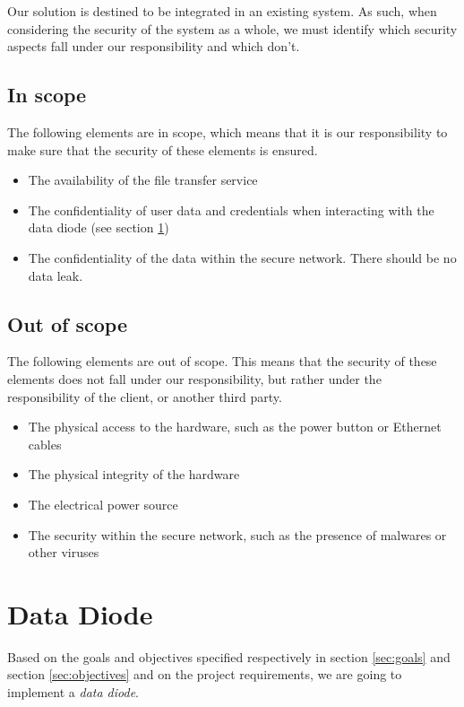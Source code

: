 \documentclass[a4paper,11pt]{article}
\begin{document}
Our solution is destined to be integrated in an existing system. As such, when considering the security of the system as a whole, we must identify which security aspects fall under our responsibility and which don't. 

\subsection{In scope}
The following elements are in scope, which means that it is our responsibility to make sure that the security of these elements is ensured.

\begin{itemize}
\item{The availability of the file transfer service}
\item{The confidentiality of user data and credentials when interacting with the data diode (see section \ref{sec:data-diode})}
\item{The confidentiality of the data within the secure network. There should be no data leak.}
\end{itemize}

\subsection{Out of scope}
\label{sec:outscope}
The following elements are out of scope. This means that the security of these elements does not fall under our responsibility, but rather under the responsibility of the client, or another third party.

\begin{itemize}
\item{The physical access to the hardware, such as the power button or Ethernet cables}
\item{The physical integrity of the hardware}
\item{The electrical power source}
\item{The security within the secure network, such as the presence of malwares or other viruses}
\end{itemize}


\section{Data Diode}
\label{sec:data-diode}
Based on the goals and objectives specified respectively in section \ref{sec:goals} and section \ref{sec:objectives} and on the project requirements, we are going to implement a \textit{data diode}.\\
\end{document}
